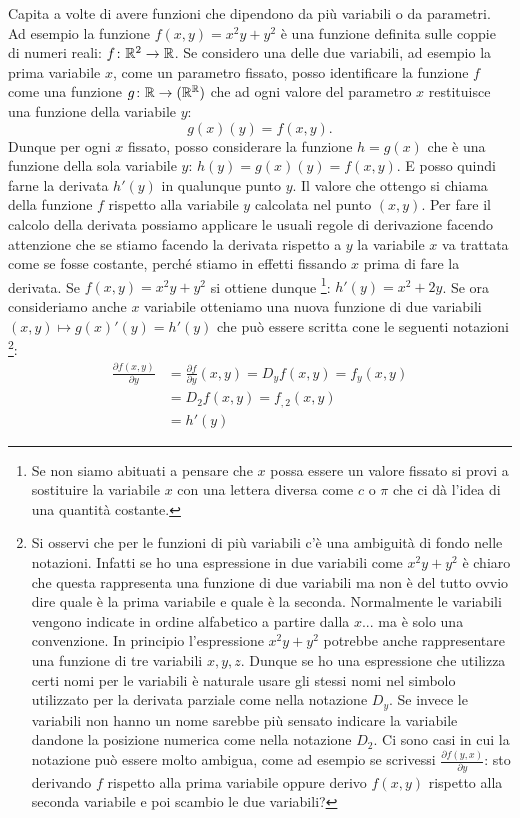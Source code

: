 Capita a volte di avere funzioni che dipendono da più variabili o da parametri.
Ad esempio la funzione $f(x,y) = x^2y+y^2$ è una funzione definita 
sulle coppie di numeri reali: $f\colon \mathbb R^2\to \mathbb R$.
Se considero una delle due variabili, ad esempio la prima variabile $x$, 
come un parametro fissato, posso identificare la funzione $f$ come 
una funzione $g\colon \mathbb R \to (\mathbb R^\mathbb R)$ 
che ad ogni valore del parametro $x$ restituisce una funzione 
della variabile $y$:
\[
  g(x)(y) = f(x,y).
\]
Dunque per ogni $x$ fissato, posso considerare la funzione $h=g(x)$
che è una funzione della sola variabile $y$: $h(y) = g(x)(y) = f(x,y)$.  
E posso quindi farne la derivata $h'(y)$ in qualunque punto $y$. 
Il valore che ottengo si chiama 
della funzione $f$ rispetto alla variabile $y$ calcolata nel punto $(x,y)$.
Per fare il calcolo della derivata possiamo applicare le usuali regole di 
derivazione facendo attenzione che se stiamo 
facendo la derivata rispetto a $y$ la variabile $x$ va trattata come se 
fosse costante, perché stiamo in effetti fissando $x$ prima di fare la derivata.
Se $f(x,y) = x^2y+y^2$ si ottiene dunque%
\footnote{Se non siamo abituati a pensare che $x$ possa essere un valore fissato 
si provi a sostituire la variabile $x$ con una lettera diversa come $c$ o $\pi$ che ci dà l'idea 
di una quantità costante.}:
$h'(y) = x^2 + 2y$.
Se ora consideriamo anche $x$ variabile otteniamo una nuova funzione di due 
variabili $(x,y)\mapsto g(x)'(y) = h'(y)$ che può essere scritta 
cone le seguenti notazioni%
\footnote{%
Si osservi che per le funzioni di più variabili c'è una ambiguità di fondo nelle notazioni.
Infatti se ho una espressione in due variabili come $x^2 y + y^2$ è chiaro 
che questa rappresenta una funzione di due variabili ma non è del tutto ovvio dire quale 
è la prima variabile e quale è la seconda. 
Normalmente le variabili vengono indicate in ordine alfabetico a partire dalla $x$... 
ma è solo una convenzione. In principio l'espressione $x^2y + y^2$ 
potrebbe anche rappresentare una funzione di tre variabili $x,y,z$. 
Dunque se ho una espressione che utilizza certi nomi per le variabili è naturale 
usare gli stessi nomi nel simbolo utilizzato per la derivata parziale come 
nella notazione $D_y$.
Se invece le variabili non hanno un nome sarebbe più sensato indicare la variabile dandone 
la posizione numerica come nella notazione $D_2$.
Ci sono casi in cui la notazione può essere molto ambigua, come ad esempio 
se scrivessi $\frac{\partial f(y,x)}{\partial y}$: 
sto derivando $f$ rispetto alla prima variabile oppure derivo $f(x,y)$ rispetto alla seconda 
variabile e poi scambio le due variabili?
}:
\begin{align*}
\frac{\partial f(x,y)}{\partial y} 
&= \frac{\partial f}{\partial y}(x,y)
= D_y f(x,y)
= f_y (x,y) \\
&= D_2 f(x,y) = f_{,2} (x,y) \\
&= h'(y)
\end{align*}

